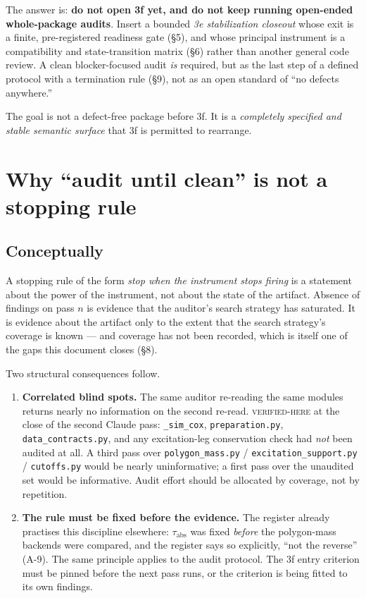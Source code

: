 \documentclass[11pt]{article}
\newcommand{\vfy}{\textsc{verified-here}}
\renewcommand{\tt}[1]{\texttt{#1}}
\newcommand{\tabs}{\ensuremath{\tau_{\mathrm{abs}}}}
\begin{document}
The answer is: \textbf{do not open 3f yet, and do not keep running open-ended
whole-package audits}. Insert a bounded \emph{3e stabilization closeout} whose exit is a
finite, pre-registered readiness gate (\S5), and whose principal instrument is a
compatibility and state-transition matrix (\S6) rather than another general code review.
A clean blocker-focused audit \emph{is} required, but as the last step of a defined
protocol with a termination rule (\S9), not as an open standard of ``no defects
anywhere.''

The goal is not a defect-free package before 3f. It is a \emph{completely specified and
stable semantic surface} that 3f is permitted to rearrange.

\section{Why ``audit until clean'' is not a stopping rule}

\subsection*{Conceptually}

A stopping rule of the form \emph{stop when the instrument stops firing} is a statement
about the power of the instrument, not about the state of the artifact. Absence of
findings on pass $n$ is evidence that the auditor's search strategy has saturated. It is
evidence about the artifact only to the extent that the search strategy's coverage is
known --- and coverage has not been recorded, which is itself one of the gaps this
document closes (\S8).

Two structural consequences follow.

\begin{enumerate}
  \item \textbf{Correlated blind spots.} The same auditor re-reading the same modules
  returns nearly no information on the second re-read. \vfy{} at the close of the second
  Claude pass: \tt{\_sim\_cox}, \tt{preparation.py}, \tt{data\_contracts.py}, and any
  excitation-leg conservation check had \emph{not} been audited at all. A third pass over
  \tt{polygon\_mass.py} / \tt{excitation\_support.py} / \tt{cutoffs.py} would be nearly
  uninformative; a first pass over the unaudited set would be informative. Audit effort
  should be allocated by coverage, not by repetition.
  \item \textbf{The rule must be fixed before the evidence.} The register already
  practises this discipline elsewhere: \tabs{} was fixed \emph{before} the polygon-mass
  backends were compared, and the register says so explicitly, ``not the reverse'' (A-9).
  The same principle applies to the audit protocol. The 3f entry criterion must be pinned
  before the next pass runs, or the criterion is being fitted to its own findings.
\end{enumerate}
\end{document}
